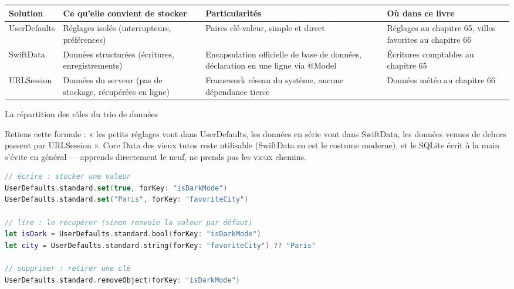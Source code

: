 


\begin{center}
\begin{tabularx}{\linewidth}{|X|X|X|X|}
\hline
\textbf{Solution} & \textbf{Ce qu'elle convient de stocker} & \textbf{Particularités} & \textbf{Où dans ce livre} \tabularnewline
\hline
UserDefaults & Réglages isolés (interrupteurs, préférences) & Paires clé-valeur, simple et direct & Réglages au chapitre 65, villes favorites au chapitre 66 \tabularnewline
SwiftData & Données structurées (écritures, enregistrements) & Encapsulation officielle de base de données, déclaration en une ligne via @Model & Écritures comptables au chapitre 65 \tabularnewline
URLSession & Données du serveur (pas de stockage, récupérées en ligne) & Framework réseau du système, aucune dépendance tierce & Données météo au chapitre 66 \tabularnewline
\hline
\end{tabularx}
\end{center}

\begin{center}\small\color{gray}La répartition des rôles du trio de données\end{center}

Retiens cette formule : « les petits réglages vont dans UserDefaults, les données en série vont dans SwiftData, les données venues de dehors passent par URLSession ». Core Data des vieux tutos reste utilisable (SwiftData en est le costume moderne), et le SQLite écrit à la main s'évite en général — apprends directement le neuf, ne prends pas les vieux chemins.


\begin{lstlisting}[language=Swift]
// écrire : stocker une valeur
UserDefaults.standard.set(true, forKey: "isDarkMode")
UserDefaults.standard.set("Paris", forKey: "favoriteCity")

// lire : le récupérer (sinon renvoie la valeur par défaut)
let isDark = UserDefaults.standard.bool(forKey: "isDarkMode")
let city = UserDefaults.standard.string(forKey: "favoriteCity") ?? "Paris"

// supprimer : retirer une clé
UserDefaults.standard.removeObject(forKey: "isDarkMode")
\end{lstlisting}


